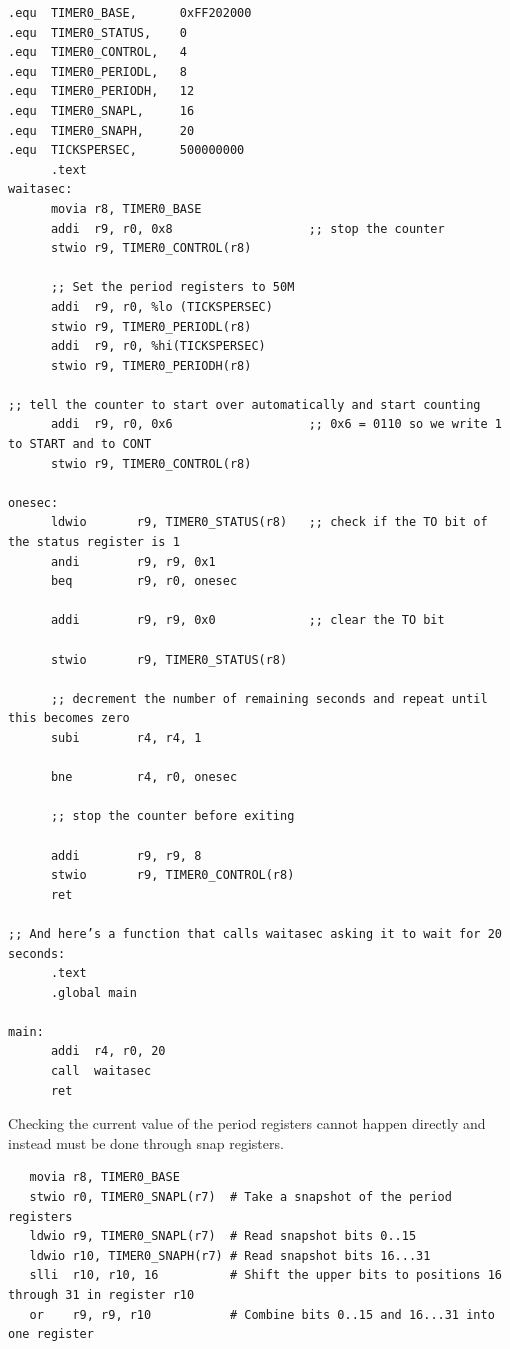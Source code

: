 \documentclass[../notes.tex]{subfiles}
\begin{document}
\begin{listing}[H]
\begin{verbatim}
.equ  TIMER0_BASE,      0xFF202000
.equ  TIMER0_STATUS,    0
.equ  TIMER0_CONTROL,   4
.equ  TIMER0_PERIODL,   8
.equ  TIMER0_PERIODH,   12
.equ  TIMER0_SNAPL,     16
.equ  TIMER0_SNAPH,     20
.equ  TICKSPERSEC,      500000000
      .text
waitasec:
      movia r8, TIMER0_BASE
      addi  r9, r0, 0x8                   ;; stop the counter
      stwio r9, TIMER0_CONTROL(r8)
 
      ;; Set the period registers to 50M
      addi  r9, r0, %lo (TICKSPERSEC)
      stwio r9, TIMER0_PERIODL(r8)
      addi  r9, r0, %hi(TICKSPERSEC)
      stwio r9, TIMER0_PERIODH(r8)
 
;; tell the counter to start over automatically and start counting
      addi  r9, r0, 0x6                   ;; 0x6 = 0110 so we write 1 to START and to CONT
      stwio r9, TIMER0_CONTROL(r8)
 
onesec:
      ldwio       r9, TIMER0_STATUS(r8)   ;; check if the TO bit of the status register is 1
      andi        r9, r9, 0x1
      beq         r9, r0, onesec
 
      addi        r9, r9, 0x0             ;; clear the TO bit
 
      stwio       r9, TIMER0_STATUS(r8)
 
      ;; decrement the number of remaining seconds and repeat until this becomes zero
      subi        r4, r4, 1
     
      bne         r4, r0, onesec         
 
      ;; stop the counter before exiting
 
      addi        r9, r9, 8        
      stwio       r9, TIMER0_CONTROL(r8)
      ret
           
;; And here’s a function that calls waitasec asking it to wait for 20 seconds:
      .text
      .global main

main:
      addi  r4, r0, 20
      call  waitasec
      ret

\end{verbatim}
\end{listing}

Checking the current value of the period registers cannot happen directly and instead must be done through snap registers.

\begin{listing}[H]
\begin{verbatim}
   movia r8, TIMER0_BASE        
   stwio r0, TIMER0_SNAPL(r7)  # Take a snapshot of the period registers
   ldwio r9, TIMER0_SNAPL(r7)  # Read snapshot bits 0..15
   ldwio r10, TIMER0_SNAPH(r7) # Read snapshot bits 16...31
   slli  r10, r10, 16          # Shift the upper bits to positions 16 through 31 in register r10
   or    r9, r9, r10           # Combine bits 0..15 and 16...31 into one register
\end{verbatim}
\end{listing}
\end{document}
